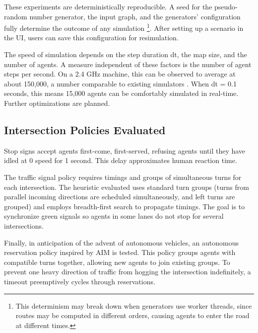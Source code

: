 \documentclass[letterpaper, 10 pt, conference]{ieeeconf}  %
\begin{document}
These experiments are deterministically reproducible. A seed for the
pseudo-random number generator, the input graph, and the generators'
configuration fully determine the outcome of any simulation \footnote{This
  determinism may break down when generators use worker threads, since routes
  may be computed in different orders, causing agents to enter the road at
different times.}. After setting up a scenario in the UI, users can save this
configuration for resimulation.

The speed of simulation depends on the step duration dt, the map size, and the
number of agents. A measure independent of these factors is the number of agent
steps per second. On a 2.4 GHz machine, this can be observed to average at about
150,000, a number comparable to existing simulators \cite{SUMOthesis}. When dt
= 0.1 seconds, this means 15,000 agents can be comfortably simulated in
real-time. Further optimizations are planned.

\subsection{Intersection Policies Evaluated}

Stop signs accept agents first-come, first-served, refusing agents until they
have idled at 0 speed for 1 second. This delay approximates human reaction time.

The traffic signal policy requires timings and groups of simultaneous turns for
each intersection. The heuristic evaluated uses standard turn groups (turns from
parallel incoming directions are scheduled simultaneously, and left turns are
grouped) and employs breadth-first search to propagate timings. The goal is to
synchronize green signals so agents in some lanes do not stop for several
intersections.

Finally, in anticipation of the advent of autonomous vehicles, an autonomous
reservation policy inspired by AIM \cite{JAIR08-dresner} is tested. This policy
groups agents with compatible turns together, allowing new agents to join
existing groups. To prevent one heavy direction of traffic from hogging the
intersection indefinitely, a timeout preemptively cycles through reservations.
\end{document}
